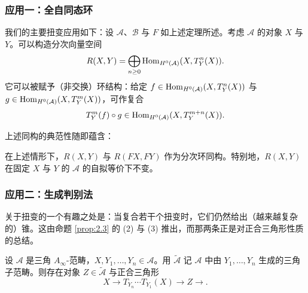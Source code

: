 
\subsubsection*{应用一：全自同态环}

我们的主要扭变应用如下：设 $\mathcal{A}$、$\mathcal{B}$ 与 $F$ 如上述定理所述。考虑 $\mathcal{A}$ 的对象 $X$ 与 $Y$。可以构造分次向量空间
\begin{equation}\label{eq:ainf-total-ring}
R(X,Y)=\bigoplus_{n\ge 0}\operatorname{Hom}_{H^0(\mathcal{A})}(X,T_Y^n(X)).
\end{equation}
它可以被赋予（非交换）环结构：给定 $f\in\operatorname{Hom}_{H^0(\mathcal{A})}(X,T_Y^n(X))$ 与 $g\in\operatorname{Hom}_{H^0(\mathcal{A})}(X,T_Y^m(X))$，可作复合
\begin{equation}\label{eq:ainf-total-composite}
T_Y^m(f)\circ g\in\operatorname{Hom}_{H^0(\mathcal{A})}(X,T_Y^{m+n}(X)).
\end{equation}


上述同构的典范性随即蕴含：

\begin{proposition}\label{prop:2.6}
在上述情形下，$R(X,Y)$ 与 $R(FX,FY)$ 作为分次环同构。特别地，$R(X,Y)$ 在固定 $X$ 与 $Y$ 的 $\mathcal{A}$ 的自拟等价下不变。
\end{proposition}

\subsubsection*{应用二：生成判别法}

关于扭变的一个有趣之处是：当复合若干个扭变时，它们仍然给出（越来越复杂的）锥。这由命题 \ref{prop:2.3} 的 (2) 与 (3) 推出，而那两条正是对正合三角形性质的总结。

\begin{lemma*}
设 $\mathcal{A}$ 是三角 $A_\infty$-范畴，$X,Y_1,\dots,Y_n\in\mathcal{A}$。用 $\widetilde{\mathcal{A}}$ 记 $\mathcal{A}$ 中由 $Y_1,\dots,Y_n$ 生成的三角子范畴。则存在对象 $Z\in\widetilde{\mathcal{A}}$ 与正合三角形
\[
X\to T_{Y_n}\cdots T_{Y_1}(X)\to Z\to .
\]
\end{lemma*}

